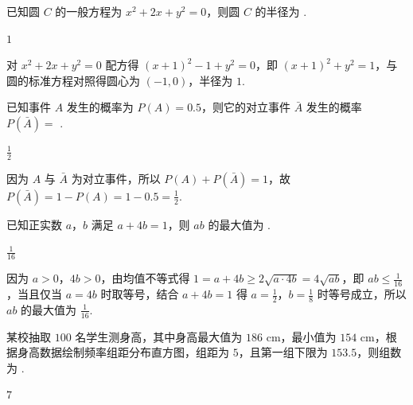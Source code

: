 \begin{problem}
已知圆 \(C\) 的一般方程为 \(x^2+2x+y^2=0\)，则圆 \(C\) 的半径为\fillinblank{} .
\end{problem}

\begin{answer}
\(1\)
\end{answer}

\begin{solution}
对 \(x^2+2x+y^2=0\) 配方得 \(\left(x+1\right)^2-1+y^2=0\)，即 \(\left(x+1\right)^2+y^2=1\)，与圆的标准方程对照得圆心为 \(\left(-1,0\right)\)，半径为 \(1\).
\end{solution}

\begin{problem}
已知事件 \(A\) 发生的概率为 \(P(A)=0.5\)，则它的对立事件 \(\bar{A}\) 发生的概率 \(P(\bar{A})=\)\fillinblank{} .
\end{problem}

\begin{answer}
\(\frac{1}{2}\)
\end{answer}

\begin{solution}
因为 \(A\) 与 \(\bar{A}\) 为对立事件，所以 \(P(A)+P(\bar{A})=1\)，故 \(P(\bar{A})=1-P(A)=1-0.5=\frac{1}{2}\).
\end{solution}

\begin{problem}
已知正实数 \(a\)，\(b\) 满足 \(a+4b=1\)，则 \(ab\) 的最大值为\fillinblank{} .
\end{problem}

\begin{answer}
\(\frac{1}{16}\)
\end{answer}

\begin{solution}
因为 \(a>0\)，\(4b>0\)，由均值不等式得 \(1=a+4b\ge 2\sqrt{a\cdot 4b}=4\sqrt{ab}\)，即 \(ab\le \frac{1}{16}\)，当且仅当 \(a=4b\) 时取等号，结合 \(a+4b=1\) 得 \(a=\frac{1}{2}\)，\(b=\frac{1}{8}\) 时等号成立，所以 \(ab\) 的最大值为 \(\frac{1}{16}\).
\end{solution}

\begin{problem}
某校抽取 \(100\) 名学生测身高，其中身高最大值为 \(186\) cm，最小值为 \(154\) cm，根据身高数据绘制频率组距分布直方图，组距为 \(5\)，且第一组下限为 \(153.5\)，则组数为\fillinblank{} .
\end{problem}

\begin{answer}
\(7\)
\end{answer}

